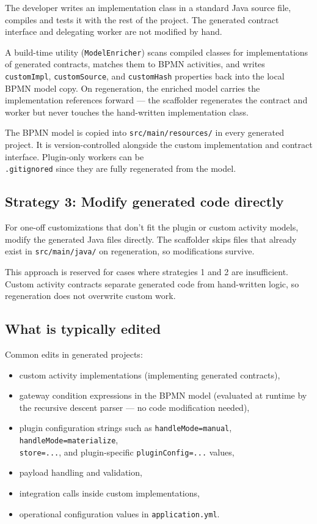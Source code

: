 The developer writes an implementation class in a standard Java source file,
compiles and tests it with the rest of the project. The generated contract
interface and delegating worker are not modified by hand.

A build-time utility (\texttt{ModelEnricher}) scans compiled classes for
implementations of generated contracts, matches them to BPMN activities, and writes
\texttt{customImpl}, \texttt{customSource}, and \texttt{customHash} properties back
into the local BPMN model copy. On regeneration, the enriched model carries the
implementation references forward --- the scaffolder regenerates the contract and
worker but never touches the hand-written implementation class.

The BPMN model is copied into \texttt{src/main/resources/} in every generated project.
It is version-controlled alongside the custom implementation and contract interface.
Plugin-only workers can be \\ \texttt{.gitignored} since they are fully regenerated from
the model.

\subsection{Strategy 3: Modify generated code directly}

For one-off customizations that don't fit the plugin or custom activity models,
modify the generated Java files directly. The scaffolder skips files that already
exist in \texttt{src/main/java/} on regeneration, so modifications survive.

This approach is reserved for cases where strategies 1 and 2 are insufficient.
Custom activity contracts separate generated code from hand-written logic, so
regeneration does not overwrite custom work.

\subsection{What is typically edited}

Common edits in generated projects:
\begin{itemize}
\item custom activity implementations (implementing generated contracts),
\item gateway condition expressions in the BPMN model (evaluated at runtime by the
  recursive descent parser --- no code modification needed),
\item plugin configuration strings such as \texttt{handleMode=manual},
  \texttt{handleMode=materialize}, \\ \texttt{store=...}, and plugin-specific
  \texttt{pluginConfig=...} values,
\item payload handling and validation,
\item integration calls inside custom implementations,
\item operational configuration values in \texttt{application.yml}.
\end{itemize}

